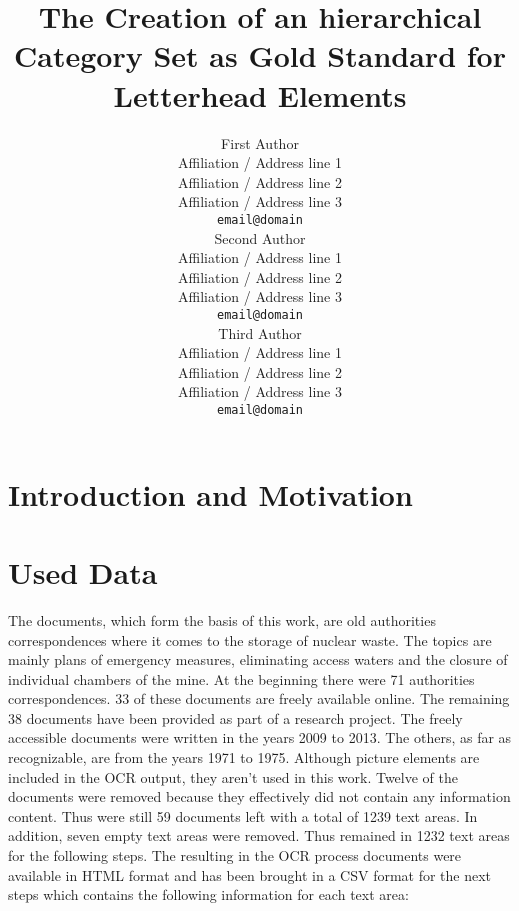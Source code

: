 \documentclass[11pt,a4paper]{article}
\title{The Creation of an hierarchical Category Set as Gold Standard for Letterhead Elements}
\author{First Author \\
  Affiliation / Address line 1 \\
  Affiliation / Address line 2 \\
  Affiliation / Address line 3 \\
  {\tt email@domain} \\\And
  Second Author \\
  Affiliation / Address line 1 \\
  Affiliation / Address line 2 \\
  Affiliation / Address line 3 \\
  {\tt email@domain} \\\And
  Third Author \\
  Affiliation / Address line 1 \\
  Affiliation / Address line 2 \\
  Affiliation / Address line 3 \\
  {\tt email@domain} \\}
\date{}
\begin{document}
\maketitle

\begin{abstract}


  
\end{abstract}

\section{Introduction and Motivation}
 \label{sec:Introduction and Motivation}


\section{Used Data}
 \label{sec:Used Data}

The documents, which form the basis of this work, are old authorities correspondences where it comes to the storage of nuclear waste. The topics are mainly plans of emergency measures, eliminating access waters and the closure of individual chambers of the mine. At the beginning there were 71 authorities correspondences. 33 of these documents are freely available online. The remaining 38 documents have been provided as part of a research project. The freely accessible documents were written in the years 2009 to 2013. The others, as far as recognizable, are from the years 1971 to 1975. Although picture elements are included in the OCR output, they aren't used in this work. Twelve of the documents were removed because they effectively did not contain any information content. Thus were still 59 documents left with a total of 1239 text areas. In addition, seven empty text areas were removed. Thus remained in 1232 text areas for the following steps. The resulting in the OCR process documents were available in HTML format and has been brought in a CSV format for the next steps which contains the following information for each text area:
\end{document}
